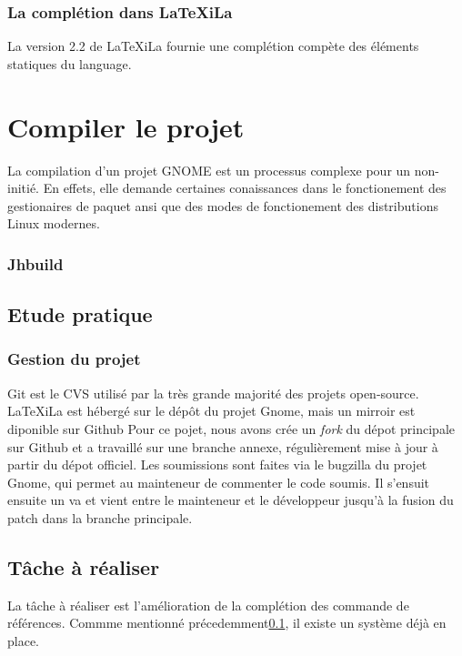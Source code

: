 \documentclass[a4paper,11pt]{report}
\begin{document}
\subsection{La complétion dans LaTeXiLa}
\label{sub:completion}
La version 2.2 de LaTeXiLa fournie une complétion compète des éléments statiques du language.


\chapter{Compiler le projet}
\label{cha:compiler}
La compilation d'un projet GNOME est un processus complexe pour un non-initié. En effets, elle demande certaines conaissances dans le fonctionement des gestionaires de paquet ansi que des modes de fonctionement des distributions Linux modernes.

\subsection{Jhbuild}
\label{sub:jhbuild}
\section{Etude pratique} %
\label{cha:etude_pratique}

\subsection{Gestion du projet} %
\label{sub:git}
Git est le CVS utilisé par la très grande majorité des projets open-source. LaTeXiLa est hébergé sur le dépôt du projet Gnome, mais un mirroir est diponible sur Github %
Pour ce pojet, nous avons crée un \textit{fork} du dépot principale sur Github et a travaillé sur une branche annexe, régulièrement mise à jour à partir du dépot officiel.
Les soumissions sont faites via le bugzilla du projet Gnome, qui permet au mainteneur de commenter le code soumis. Il s'ensuit ensuite un va et vient entre le mainteneur et le développeur jusqu'à la fusion du patch dans la branche principale.

\section{Tâche à réaliser} %
\label{sec:tache_a_realiser}
La tâche à réaliser est l'amélioration de la complétion des commande de références. Commme mentionné précedemment\ref{sub:completion}, il existe un système déjà en place.
\end{document}
